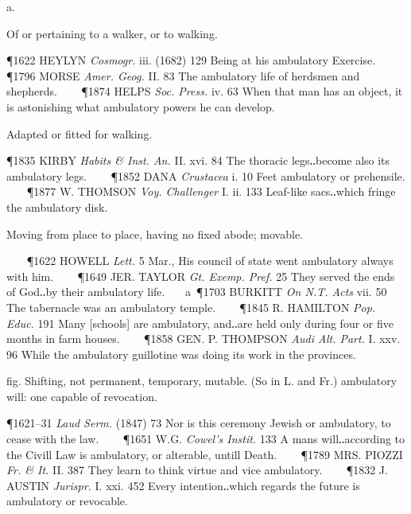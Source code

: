 \begin{description}[wide, labelwidth=!, labelindent=0pt]
  a.

\noindent  {}

\vspace{-0.3cm}

\begin{myenumerate}
 Of or pertaining to a walker, or to walking. 

\P 1622 HEYLYN \textit{Cosmogr.} iii. (1682) 129 Being at his ambulatory Exercise.    
\P 1796 MORSE \textit{Amer. Geog.} II. 83 The ambulatory life of herdsmen and shepherds.    
\P 1874 HELPS \textit{Soc. Press.} iv. 63 When that man has an object, it is astonishing what ambulatory powers he can develop.

 Adapted or fitted for walking. 

\P 1835 KIRBY \textit{Habits \& Inst. An.} II. xvi. 84 The thoracic legs‥become also its ambulatory legs.    
\P 1852 DANA \textit{Crustacea} i. 10 Feet ambulatory or prehensile.    
\P 1877 W. THOMSON \textit{Voy. Challenger} I. ii. 133 Leaf-like sacs‥which fringe the ambulatory disk.

 Moving from place to place, having no fixed abode; movable. 

   
\P 1622 HOWELL \textit{Lett.} 5 Mar., His council of state went ambulatory always with him.    
\P 1649 JER. TAYLOR \textit{Gt. Exemp. Pref.} 25 They served the ends of God‥by their ambulatory life.    a 
\P 1703 BURKITT \textit{On N.T. Acts} vii. 50 The tabernacle was an ambulatory temple.    
\P 1845 R. HAMILTON \textit{Pop. Educ.} 191 Many [schools] are ambulatory, and‥are held only during four or five months in farm houses.    
\P 1858 GEN. P. THOMPSON  \textit{Audi Alt. Part.} I. xxv. 96 While the ambulatory guillotine was doing its work in the provinces.

 fig. Shifting, not permanent, temporary, mutable. (So in L. and Fr.) ambulatory will: one capable of revocation. 

\P 1621–31 \textit{Laud Serm.} (1847) 73 Nor is this ceremony Jewish or ambulatory, to cease with the law.    
\P 1651 W.G. \textit{Cowel's Instit.} 133 A mans will‥according to the Civill Law is ambulatory, or alterable, untill Death.    
\P 1789 MRS. PIOZZI \textit{Fr. \& It.} II. 387 They learn to think virtue and vice ambulatory.    
\P 1832 J. AUSTIN \textit{Jurispr.} I. xxi. 452 Every intention‥which regards the future is ambulatory or revocable.


\end{myenumerate}
\end{description}

